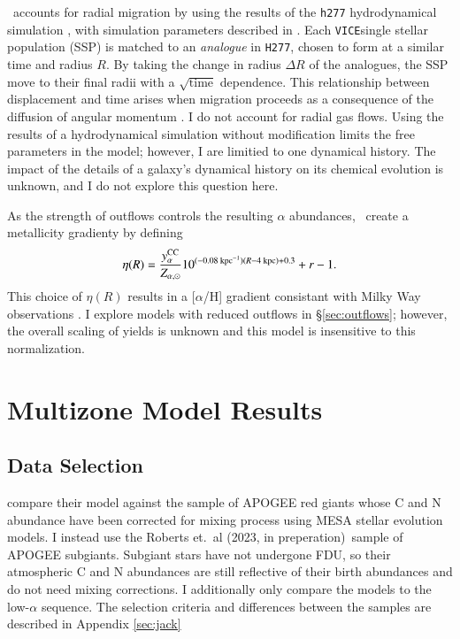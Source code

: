 \documentclass[12pt,oneside]{report}
\newcommand{\JJ}{\citetalias{james+21}}
\newcommand{\VICE}{\texttt{VICE}}
\newcommand{\citetjack}{Roberts et.\ al (2023, in preperation)}
\begin{document}
\JJ\ accounts for radial migration by using the results of the \texttt{h277} hydrodynamical simulation \citep{christensen12, zolotov12, loebman12, BZ14}, with simulation parameters described in \citet{bird+21}. Each \VICE single stellar population (SSP) is matched to an \textit{analogue} in \texttt{H277}, chosen to form at a similar time and radius $R$. By taking the change in radius $\Delta R$ of the analogues, the SSP move to their final radii with a $\sqrt{\text{time}}$ dependence.
This relationship between displacement and time arises when migration proceeds as a consequence of the diffusion of angular momentum \citep{frankel18, frankel20}.
I do not account for radial gas flows.
Using the results of a hydrodynamical simulation without modification limits the free parameters in the model; however, I are limitied to one dynamical history. The impact of the details of a galaxy's dynamical history on its chemical evolution is unknown, and I do not explore this question here.

As the strength of outflows controls the resulting $\alpha$ abundances, \JJ~create a metallicity gradienty by defining
\begin{equation}
\eta(R) = \frac{y_{\alpha}^{\rm CC}}{Z_{\alpha, \odot}} 10^{(-0.08\text{ kpc}^{-1})(R-4\text{ kpc})+0.3} + r - 1.
\end{equation}
This choice of $\eta(R)$ results in a [$\alpha$/H] gradient consistant with Milky Way observations \citep{james+21}. I explore models with reduced outflows in \S\ref{sec:outflows}; however, the overall scaling of yields is unknown and this model is insensitive to this normalization.


\chapter{Multizone Model Results}
\section{Data Selection}

\citet{james+23} compare their model against the \cite{vincenzo+21} sample of APOGEE \citet{apogee17} red giants whose C and N abundance have been corrected for mixing process using MESA stellar evolution models. 
I instead use the \citetjack~sample of APOGEE subgiants. Subgiant stars have not undergone FDU, so their atmospheric C and N abundances are still reflective of their birth abundances and do not need mixing corrections. I additionally only compare the models to the low-$\alpha$ sequence.  The selection criteria and differences between the samples are described in Appendix \ref{sec:jack}
\end{document}
